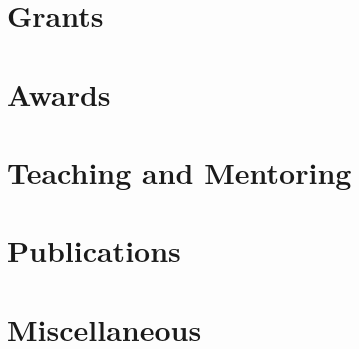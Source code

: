 \documentclass[a4paper,12pt]{article}
\begin{document}
\section{Grants}

\section{Awards}

\section{Teaching and Mentoring}


\section{Publications}


\section{Miscellaneous}


\vfill
{}
\end{document}
